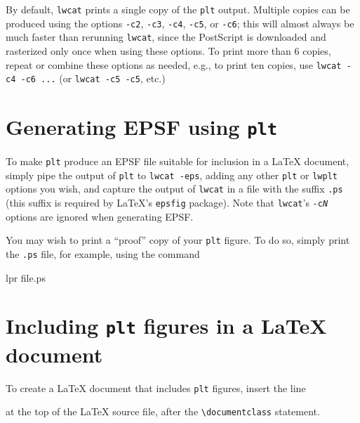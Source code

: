 \documentclass{book}
\begin{document}
By default, {\tt lwcat} prints a single copy of the {\tt plt} output.
Multiple copies can be produced using the options {\tt -c2}, {\tt -c3},
{\tt -c4}, {\tt -c5}, or {\tt -c6}; this will almost always be much
faster than rerunning {\tt lwcat}, since the PostScript is downloaded
and rasterized only once when using these options.  To print more
than 6 copies, repeat or combine these options as needed, e.g., to
print ten copies, use {\tt lwcat -c4 -c6 ...} (or {\tt lwcat -c5 -c5},
etc.)

\section{Generating EPSF using {\tt plt} \label{sec:epsf}}

%
To make {\tt plt} produce an EPSF file suitable for inclusion in a \LaTeX{}
document, simply pipe the output of {\tt plt} to {\tt lwcat -eps}, adding
any other {\tt plt} or {\tt lwplt} options you wish, and capture the output
of {\tt lwcat} in a file with the suffix {\tt .ps} (this suffix is required by
\LaTeX{}'s {\tt epsfig} package).  Note that {\tt lwcat}'s {\tt -c{\em N}}
options are ignored when generating EPSF.

You may wish to print a ``proof'' copy of your {\tt plt} figure.  To do so,
simply print the {\tt .ps} file, for example, using the command
\begin{center}
\begin{boxedverbatim}
lpr file.ps
\end{boxedverbatim}
\end{center}

\section{Including {\tt plt} figures in a \LaTeX{} document \label{sec:latex}}

To create a \LaTeX{} document that includes {\tt plt} figures, insert
the line
\begin{center}
\begin{boxedverbatim}
\usepackage{epsfig}
\end{boxedverbatim}
\end{center}
at the top of the \LaTeX{} source file, after the \verb+\documentclass+
statement.
\end{document}
